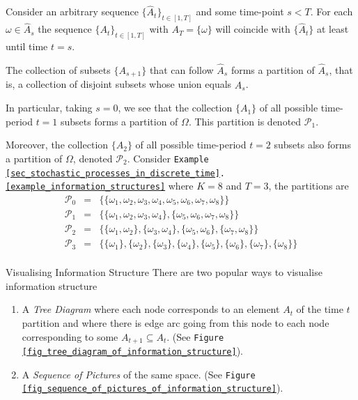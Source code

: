 \documentclass[11pt,a4paper]{article}
\begin{document}
  \begin{example}{}
    Consider an arbitrary sequence $\{\hat{A}_t\}_{t\in[1,T]}$ and some time-point $s<T$. For each $\omega\in \hat{A}_s$ the sequence $\{A_t\}_{t\in[1,T]}$ with $A_T=\{\omega\}$ will coincide with $\{\hat{A}_t\}$ at least until time $t=s$.
    \par The collection of subsets $\{A_{s+1}\}$ that can follow $\hat{A}_s$ forms a partition of $\hat{A}_s$, that is, a collection of disjoint subsets whose union equals $\hat{A}_s$.
    \par In particular, taking $s=0$, we see that the collection $\{A_1\}$ of all possible time-period $t=1$ subsets forms a partition of $\Omega$. This partition is denoted $\mathcal{P}_1$.
    \par Moreover, the collection $\{A_2\}$ of all possible time-period $t=2$ subsets also forms a partition of $\Omega$, denoted $\mathcal{P}_2$.
    Consider \texttt{Example \ref{sec_stochastic_processes_in_discrete_time}.\ref{example_information_structures}} where $K=8$ and $T=3$, the partitions are
    \[\begin{array}{rcl}
      \mathcal{P}_0&=&\big\{\{\omega_1,\omega_2,\omega_3,\omega_4,\omega_5,\omega_6,\omega_7,\omega_8\}\big\}\\
      \mathcal{P}_1&=&\big\{\{\omega_1,\omega_2,\omega_3,\omega_4\},\{\omega_5,\omega_6,\omega_7,\omega_8\}\big\}\\
      \mathcal{P}_2&=&\big\{\{\omega_1,\omega_2\},\{\omega_3,\omega_4\},\{\omega_5,\omega_6\},\{\omega_7,\omega_8\}\big\}\\
      \mathcal{P}_3&=&\big\{\{\omega_1\},\{\omega_2\},\{\omega_3\},\{\omega_4\},\{\omega_5\},\{\omega_6\},\{\omega_7\},\{\omega_8\}\big\}\\
    \end{array}\]
  \end{example}

  \begin{remark}{Visualising Information Structure}
    There are two popular ways to visualise information structure
    \begin{enumerate}
      \item A \textit{Tree Diagram} where each node corresponds to an element $A_t$ of the time $t$ partition and where there is edge arc going from this node to each node corresponding to some $A_{t+1}\subseteq A_t$. (See \texttt{Figure \ref{fig_tree_diagram_of_information_structure}}).
      \item A \textit{Sequence of Pictures} of the same space. (See \texttt{Figure \ref{fig_sequence_of_pictures_of_information_structure}}).
    \end{enumerate}
  \end{remark}
\end{document}
